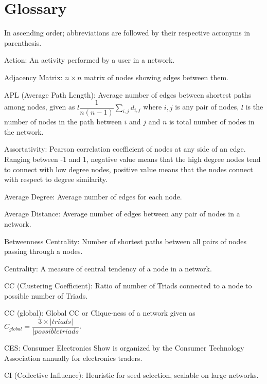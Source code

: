 
\chapter{Glossary}


In ascending order; abbreviations are followed by their respective acronyms in parenthesis.

Action: An activity performed by a user in a network.

Adjacency Matrix: $n\times n$ matrix of nodes showing edges between them.

APL (Average Path Length): Average number of edges between shortest paths among nodes, given as $l\dfrac{1}{n(n-1)}\sum_{i,j}d_{i,j}$ where $i,j$ is any pair of nodes, $l$ is the number of nodes in the path between $i$ and $j$ and $n$ is total number of nodes in the network.

Assortativity: Pearson correlation coefficient of nodes at any side of an edge. Ranging between -1 and 1, negative value means that the high degree nodes tend to connect with low degree nodes, positive value means that the nodes connect with respect to degree similarity.

Average Degree: Average number of edges for each node.

Average Distance: Average number of edges between any pair of nodes in a network.

Betweenness Centrality: Number of shortest paths between all pairs of nodes passing through a nodes.

Centrality: A measure of central tendency of a node in a network.

CC (Clustering Coefficient): Ratio of number of Triads connected to a node to possible number of Triads.

CC (global): Global CC or Clique-ness of a network given as $C_{global}=\dfrac{3\times |triads|}{|possible triads}$.

CES: Consumer Electronics Show is organized by the Consumer Technology Association annually for electronics traders.

CI (Collective Influence): Heuristic for seed selection, scalable on large networks.

